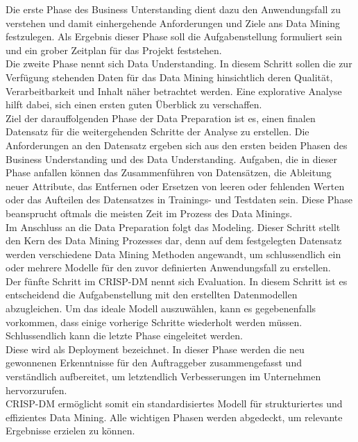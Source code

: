 Die erste Phase des Business Unterstanding dient dazu den Anwendungsfall zu verstehen und damit einhergehende
Anforderungen und Ziele ans Data Mining festzulegen. Als Ergebnis dieser Phase soll die Aufgabenstellung formuliert
sein und ein grober Zeitplan für das Projekt feststehen. \\
Die zweite Phase nennt sich Data Understanding. In diesem Schritt sollen die zur Verfügung stehenden Daten für das
Data Mining hinsichtlich deren Qualität, Verarbeitbarkeit und Inhalt näher betrachtet werden.
Eine explorative Analyse hilft dabei, sich einen ersten guten Überblick zu verschaffen. \\
Ziel der darauffolgenden Phase der Data Preparation ist es, einen finalen Datensatz für die weitergehenden Schritte
der Analyse zu erstellen. Die Anforderungen an den Datensatz ergeben sich aus den ersten beiden Phasen des
Business Understanding und des Data Understanding. Aufgaben, die in dieser Phase anfallen können das Zusammenführen
von Datensätzen, die Ableitung neuer Attribute, das Entfernen oder Ersetzen von leeren oder fehlenden Werten oder
das Aufteilen des Datensatzes in Trainings- und Testdaten sein. Diese Phase beansprucht oftmals die meisten
Zeit im Prozess des Data Minings.\\
Im Anschluss an die Data Preparation folgt das Modeling. Dieser Schritt stellt den Kern des Data Mining Prozesses dar,
denn auf dem festgelegten Datensatz werden verschiedene Data Mining Methoden angewandt, um schlussendlich ein oder
mehrere Modelle für den zuvor definierten Anwendungsfall zu erstellen. \\
Der fünfte Schritt im CRISP-DM nennt sich Evaluation. In diesem Schritt ist es entscheidend die Aufgabenstellung mit
den erstellten Datenmodellen abzugleichen. Um das ideale Modell auszuwählen, kann es gegebenenfalls vorkommen,
dass einige vorherige Schritte wiederholt werden müssen. Schlussendlich kann die letzte Phase eingeleitet werden. \\
Diese wird als Deployment bezeichnet. In dieser Phase werden die neu gewonnenen Erkenntnisse für den Auftraggeber
zusammengefasst und verständlich aufbereitet, um letztendlich Verbesserungen im Unternehmen hervorzurufen.\\
CRISP-DM ermöglicht somit ein standardisiertes Modell für strukturiertes und effizientes Data Mining.
Alle wichtigen Phasen werden abgedeckt, um relevante Ergebnisse erzielen zu können.


